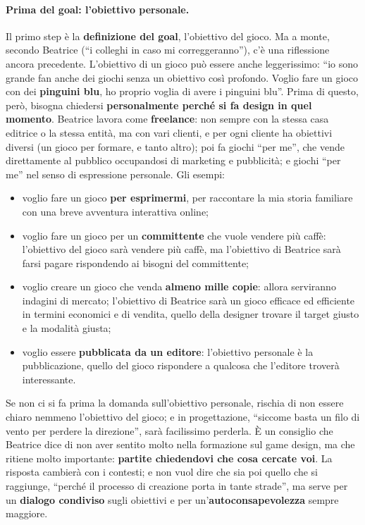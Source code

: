 \paragraph{Prima del goal: l'obiettivo personale.} Il primo step è la
\textbf{definizione del goal}, l'obiettivo del gioco. Ma a monte, secondo Beatrice
(``i colleghi in caso mi correggeranno''), c'è una riflessione ancora precedente.
L'obiettivo di un gioco può essere anche leggerissimo: ``io sono grande fan anche dei
giochi senza un obiettivo così profondo. Voglio fare un gioco con dei
\textbf{pinguini blu}, ho proprio voglia di avere i pinguini blu''. Prima di questo,
però, bisogna chiedersi \textbf{personalmente perché si fa design in quel momento}.
Beatrice lavora come \textbf{freelance}: non sempre con la stessa casa editrice o la
stessa entità, ma con vari clienti, e per ogni cliente ha obiettivi diversi (un gioco
per formare, e tanto altro); poi fa giochi ``per me'', che vende direttamente al
pubblico occupandosi di marketing e pubblicità; e giochi ``per me'' nel senso di
espressione personale. Gli esempi:
\begin{itemize}
  \item voglio fare un gioco \textbf{per esprimermi}, per raccontare la mia storia
        familiare con una breve avventura interattiva online;
  \item voglio fare un gioco per un \textbf{committente} che vuole vendere più caffè:
        l'obiettivo del gioco sarà vendere più caffè, ma l'obiettivo di Beatrice sarà
        farsi pagare rispondendo ai bisogni del committente;
  \item voglio creare un gioco che venda \textbf{almeno mille copie}: allora serviranno
        indagini di mercato; l'obiettivo di Beatrice sarà un gioco efficace ed
        efficiente in termini economici e di vendita, quello della designer trovare il
        target giusto e la modalità giusta;
  \item voglio essere \textbf{pubblicata da un editore}: l'obiettivo personale è la
        pubblicazione, quello del gioco rispondere a qualcosa che l'editore troverà
        interessante.
\end{itemize}
Se non ci si fa prima la domanda sull'obiettivo personale, rischia di non essere
chiaro nemmeno l'obiettivo del gioco; e in progettazione, ``siccome basta un filo di
vento per perdere la direzione'', sarà facilissimo perderla. È un consiglio che
Beatrice dice di non aver sentito molto nella formazione sul game design, ma che
ritiene molto importante: \textbf{partite chiedendovi che cosa cercate voi}. La
risposta cambierà con i contesti; e non vuol dire che sia poi quello che si
raggiunge, ``perché il processo di creazione porta in tante strade'', ma serve per un
\textbf{dialogo condiviso} sugli obiettivi e per un'\textbf{autoconsapevolezza}
sempre maggiore.

